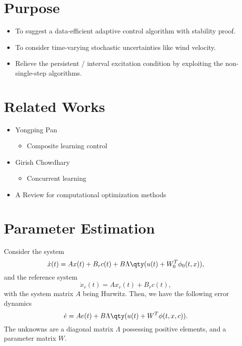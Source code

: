 \documentclass[nobib]{my-handout}
\begin{document}
\maketitle

\section{Purpose}

\begin{itemize}
\item
  To suggest a data-efficient adaptive control algorithm with stability
  proof.
\item
  To consider time-varying stochastic uncertainties like wind velocity.
\item
  Relieve the persistent / interval excitation condition by exploiting
  the non-single-step algorithms.
\end{itemize}

\section{Related Works}

\begin{itemize}
	\item Yongping Pan~\cite{pan_composite_2016,pan_composite_2018}
		\begin{itemize}
			\item
				Composite learning control
		\end{itemize}
	\item Girish
		Chowdhary~\cite{chowdhary_concurrent_2013-1,kamalapurkar_concurrent_2017}
		\begin{itemize}
			\item
				Concurrent learning
		\end{itemize}
	\item A Review for computational optimization
		methods~\cite{bottou_optimization_2018}
\end{itemize}

\section{Parameter Estimation}

Consider the system \[
\dot{x}(t) = A x(t) + B_r c(t) + B \Lambda \qty(u(t) + W_0^T \phi_0(t, x)),
\] and the reference system \[
\dot{x}_r(t) = A x_r(t) + B_r c(t),
\] with the system matrix \(A\) being Hurwitz. Then, we have the
following error dynamics \[
\dot{e} = A e(t) + B \Lambda \qty(u(t) + W^T \phi(t, x, c)).
\] The unknowns are a diagonal matrix \(\Lambda\) possessing positive
elements, and a parameter matrix \(W\).
\end{document}
